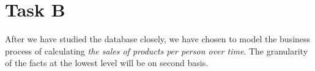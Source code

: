 \section{Task B}
After we have studied the database closely, we have chosen to model the business process of calculating \textit{the sales of products per person over time}. 
The granularity of the facts at the lowest level will be on second basis.
